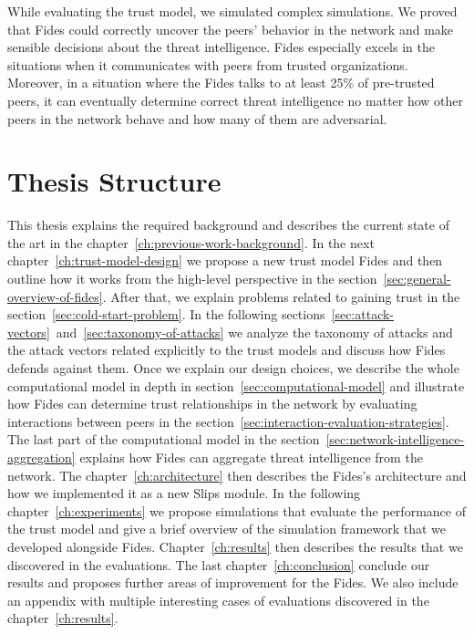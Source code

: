 While evaluating the trust model, we simulated complex simulations. We proved that Fides could correctly uncover the peers' behavior in the network and make sensible decisions about the threat intelligence. 
Fides especially excels in the situations when it communicates with peers from trusted organizations.
Moreover, in a situation where the Fides talks to at least 25\% of pre-trusted peers, it can eventually determine correct threat intelligence no matter how other peers in the network behave and how many of them are adversarial.

\section{Thesis Structure}
\label{sec:thesis-structure}
This thesis explains the required background and describes the current state of the art in the chapter~\ref{ch:previous-work-background}.
In the next chapter~\ref{ch:trust-model-design} we propose a new trust model Fides and then outline how it works from the high-level perspective in the section~\ref{sec:general-overview-of-fides}.
After that, we explain problems related to gaining trust in the section~\ref{sec:cold-start-problem}.
In the following sections~\ref{sec:attack-vectors}~and~\ref{sec:taxonomy-of-attacks} we analyze the taxonomy of attacks and the attack vectors related explicitly to the trust models and discuss how Fides defends against them.
Once we explain our design choices, we describe the whole computational model in depth in section~\ref{sec:computational-model} and illustrate how Fides can determine trust relationships in the network by evaluating interactions between peers in the section~\ref{sec:interaction-evaluation-strategies}.
The last part of the computational model in the section~\ref{sec:network-intelligence-aggregation} explains how Fides can aggregate threat intelligence from the network.
The chapter~\ref{ch:architecture} then describes the Fides's architecture and how we implemented it as a new Slips module.
In the following chapter~\ref{ch:experiments} we propose simulations that evaluate the performance of the trust model and give a brief overview of the simulation framework that we developed alongside Fides.
Chapter~\ref{ch:results} then describes the results that we discovered in the evaluations. The last chapter~\ref{ch:conclusion} conclude our results and proposes further areas of improvement for the Fides. 
We also include an appendix with multiple interesting cases of evaluations discovered in the chapter~\ref{ch:results}.

